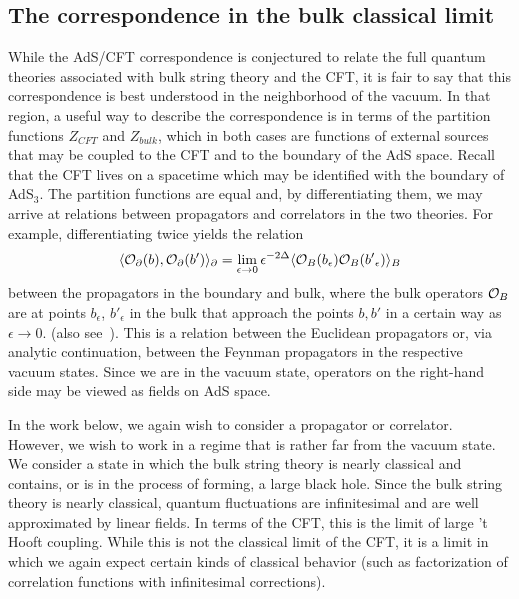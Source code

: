 \documentclass[a4paper,12pt]{article}
\def\calo{{\cal O}}
\begin{document}
\subsection{The correspondence in the bulk classical limit}
\label{bcl}

While the AdS/CFT correspondence is conjectured to relate the full
quantum theories associated with bulk string theory and the CFT, it is
fair to say that this correspondence is best understood in the
neighborhood of the vacuum.  In that region, a useful way to describe
the correspondence is in terms of the partition functions $Z_{CFT}$
and $Z_{bulk}$, which in both cases are functions of external sources
that may be coupled to the CFT and to the boundary of the AdS space.
Recall that the CFT lives on a spacetime which may be identified with
the boundary of AdS$_3$.  The partition functions are equal and, by
differentiating them, we may arrive at relations between propagators
and correlators in the two theories.  For example, differentiating
twice yields the relation~\cite{bdhm}
\begin{equation} \label{prop1}
\langle \calo_\partial (b), \calo_\partial (b') \rangle_{\partial} =
\lim_{\epsilon \rightarrow 0} \epsilon^{-2 \Delta} \langle \calo_{B}
(b_\epsilon) \calo_B (b'{}_\epsilon) \rangle_B
\end{equation}
between the propagators in the boundary and bulk, where the bulk
operators $\calo_B$ are at points $b_\epsilon$, $b'{}_\epsilon$ in the
bulk that approach the points $b,b'$ in a certain way as $\epsilon
\rightarrow 0$.  (also see~\cite{witten,gkp}).  This is a relation
between the Euclidean propagators or, via analytic continuation,
between the Feynman propagators in the respective vacuum states.
Since we are in the vacuum state, operators on the right-hand
side may be viewed as fields on AdS space.


In the work below, we again wish to consider a propagator or
correlator.  However, we wish to work in a regime that is rather far
from the vacuum state.  We consider a state in which the bulk string
theory is nearly classical and contains, or is in the process of
forming, a large black hole.  Since the bulk string theory is nearly
classical, quantum fluctuations are infinitesimal and are well
approximated by linear fields.  In terms of the CFT, this is the limit
of large 't Hooft coupling.  While this is not the classical limit of
the CFT, it is a limit in which we again expect certain kinds of
classical behavior (such as factorization of correlation functions
with infinitesimal corrections).
\end{document}
